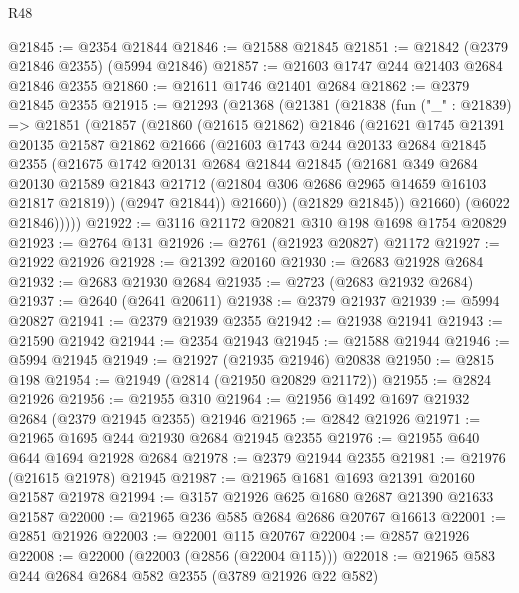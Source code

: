 \begin{lexlean}{R48}
\begin{coremodule}
@21845 := @2354 @21844
@21846 := @21588 @21845
@21851 := @21842 (@2379 @21846 @2355) (@5994 @21846)
@21857 := @21603 @1747 @244 @21403 @2684 @21846 @2355
@21860 := @21611 @1746 @21401 @2684
@21862 := @2379 @21845 @2355
@21915 := @21293
    (@21368
      (@21381
        (@21838
          (fun ("_" : @21839) =>
          @21851
            (@21857
              (@21860
                (@21615 @21862)
                @21846
                (@21621
                  @1745
                  @21391
                  @20135
                  @21587
                  @21862
                  @21666
                  (@21603
                    @1743
                    @244
                    @20133
                    @2684
                    @21845
                    @2355
                    (@21675
                      @1742
                      @20131
                      @2684
                      @21844
                      @21845
                      (@21681
                        @349
                        @2684
                        @20130
                        @21589
                        @21843
                        @21712
                        (@21804 @306 @2686 @2965 @14659 @16103 @21817 @21819))
                      (@2947 @21844))
                    @21660))
                (@21829 @21845))
              @21660)
            (@6022 @21846)))))
@21922 := @3116 @21172 @20821 @310 @198 @1698 @1754 @20829
@21923 := @2764 @131
@21926 := @2761 (@21923 @20827) @21172
@21927 := @21922 @21926
@21928 := @21392 @20160
@21930 := @2683 @21928 @2684
@21932 := @2683 @21930 @2684
@21935 := @2723 (@2683 @21932 @2684)
@21937 := @2640 (@2641 @20611)
@21938 := @2379 @21937
@21939 := @5994 @20827
@21941 := @2379 @21939 @2355
@21942 := @21938 @21941
@21943 := @21590 @21942
@21944 := @2354 @21943
@21945 := @21588 @21944
@21946 := @5994 @21945
@21949 := @21927 (@21935 @21946) @20838
@21950 := @2815 @198
@21954 := @21949 (@2814 (@21950 @20829 @21172))
@21955 := @2824 @21926
@21956 := @21955 @310
@21964 := @21956 @1492 @1697 @21932 @2684 (@2379 @21945 @2355) @21946
@21965 := @2842 @21926
@21971 := @21965 @1695 @244 @21930 @2684 @21945 @2355
@21976 := @21955 @640 @644 @1694 @21928 @2684
@21978 := @2379 @21944 @2355
@21981 := @21976 (@21615 @21978) @21945
@21987 := @21965 @1681 @1693 @21391 @20160 @21587 @21978
@21994 := @3157 @21926 @625 @1680 @2687 @21390 @21633 @21587
@22000 := @21965 @236 @585 @2684 @2686 @20767 @16613
@22001 := @2851 @21926
@22003 := @22001 @115 @20767
@22004 := @2857 @21926
@22008 := @22000 (@22003 (@2856 (@22004 @115)))
@22018 := @21965 @583 @244 @2684 @2684 @582 @2355 (@3789 @21926 @22 @582)

\end{coremodule}
\end{lexlean}
